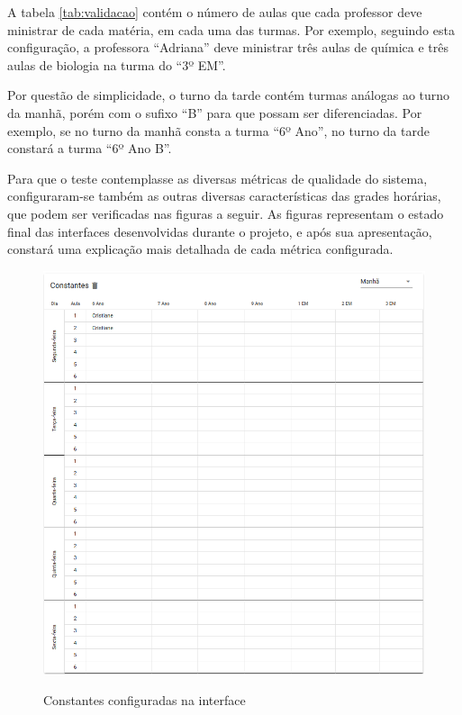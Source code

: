 A tabela \ref{tab:validacao} contém o número de aulas que cada professor deve ministrar de cada matéria, em cada uma das turmas. Por exemplo, seguindo esta configuração, a professora ``Adriana'' deve ministrar três aulas de química e três aulas de biologia na turma do ``3º EM''.



\newpage
Por questão de simplicidade, o turno da tarde contém turmas análogas ao turno da manhã, porém com o sufixo ``B'' para que possam ser diferenciadas. Por exemplo, se no turno da manhã consta a turma ``6º Ano'', no turno da tarde constará a turma ``6º Ano B''.

Para que o teste contemplasse as diversas métricas de qualidade do sistema, configuraram-se também as outras diversas características das grades horárias, que podem ser verificadas nas figuras a seguir. As figuras representam o estado final das interfaces desenvolvidas durante o projeto, e após sua apresentação, constará uma explicação mais detalhada de cada métrica configurada.

\begin{figure}[p]
	\centering
	\caption{Constantes configuradas na interface}
	\includegraphics[width=1\textwidth]{./dados/figuras/constantes_configuradas}
	\label{fig:constantes_configuradas}
\end{figure}


